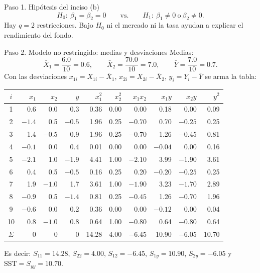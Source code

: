 \documentclass[11pt,letterpaper]{article}
\newcommand{\SST}{\mathrm{SST}}
\begin{document}
\begin{paso}{Paso 1. Hipótesis del inciso (b)}
\[
H_0:\ \beta_1=\beta_2=0\qquad\text{vs.}\qquad H_1:\ \beta_1\neq0\ \text{o}\ \beta_2\neq0 .
\]
Hay $q=2$ restricciones. Bajo $H_0$ ni el mercado ni la tasa ayudan a explicar el rendimiento del fondo.
\end{paso}

\begin{paso}{Paso 2. Modelo no restringido: medias y desviaciones}
Medias:
\[
\bar X_1=\frac{6.0}{10}=0.6,\qquad \bar X_2=\frac{70.0}{10}=7.0,\qquad \bar Y=\frac{7.0}{10}=0.7 .
\]
Con las desviaciones $x_{1i}=X_{1i}-\bar X_1$, $x_{2i}=X_{2i}-\bar X_2$, $y_i=Y_i-\bar Y$ se arma la tabla:

\begin{center}
\small
\begin{tabular}{c|rrr|rrrrrr}
\toprule
$i$ & $x_1$ & $x_2$ & $y$ & $x_1^2$ & $x_2^2$ & $x_1x_2$ & $x_1y$ & $x_2y$ & $y^2$\\
\midrule
1  & 0.6  & 0.0  & 0.3  & 0.36 & 0.00 & 0.00  & 0.18  & 0.00  & 0.09\\
2  & $-1.4$ & 0.5  & $-0.5$ & 1.96 & 0.25 & $-0.70$ & 0.70  & $-0.25$ & 0.25\\
3  & 1.4  & $-0.5$ & 0.9  & 1.96 & 0.25 & $-0.70$ & 1.26  & $-0.45$ & 0.81\\
4  & $-0.1$ & 0.0  & 0.4  & 0.01 & 0.00 & 0.00  & $-0.04$ & 0.00  & 0.16\\
5  & $-2.1$ & 1.0  & $-1.9$ & 4.41 & 1.00 & $-2.10$ & 3.99  & $-1.90$ & 3.61\\
6  & 0.4  & 0.5  & $-0.5$ & 0.16 & 0.25 & 0.20  & $-0.20$ & $-0.25$ & 0.25\\
7  & 1.9  & $-1.0$ & 1.7  & 3.61 & 1.00 & $-1.90$ & 3.23  & $-1.70$ & 2.89\\
8  & $-0.9$ & 0.5  & $-1.4$ & 0.81 & 0.25 & $-0.45$ & 1.26  & $-0.70$ & 1.96\\
9  & $-0.6$ & 0.0  & 0.2  & 0.36 & 0.00 & 0.00  & $-0.12$ & 0.00  & 0.04\\
10 & 0.8  & $-1.0$ & 0.8  & 0.64 & 1.00 & $-0.80$ & 0.64  & $-0.80$ & 0.64\\
\midrule
$\Sigma$ & 0 & 0 & 0 & 14.28 & 4.00 & $-6.45$ & 10.90 & $-6.05$ & 10.70\\
\bottomrule
\end{tabular}
\end{center}
Es decir: $S_{11}=14.28$, $S_{22}=4.00$, $S_{12}=-6.45$, $S_{1y}=10.90$, $S_{2y}=-6.05$ y
$\SST=S_{yy}=10.70$.
\end{paso}
\end{document}
